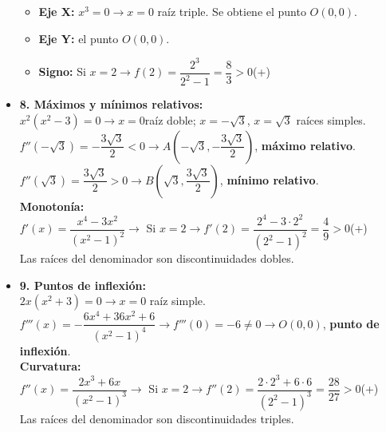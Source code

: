\begin{itemize}
	\begin{itemize}
		\item \textbf{Eje X: }$x^3=0 \rightarrow x=0$ raíz triple. Se obtiene el punto $O(0,0)$.
		\item \textbf{Eje Y: }el punto $O(0,0)$.
		\item \textbf{Signo: }Si $x=2 \rightarrow f(2)=\dfrac{2^3}{2^2-1}=\dfrac{8}{3}>0$(+)
	\end{itemize}
	\item \textbf{8. Máximos y mínimos relativos:}\\
	$x^2(x^2-3)=0 \rightarrow x=0 $raíz doble; $x=-\sqrt{3}$, $x=\sqrt{3}$ raíces simples.\\
	$f''(-\sqrt{3})=-\dfrac{3\sqrt{3}}{2}<0 \rightarrow A(-\sqrt{3}, -\dfrac{3\sqrt{3}}{2})$, \textbf{máximo relativo}.\\
	$f''(\sqrt{3})=\dfrac{3\sqrt{3}}{2}>0 \rightarrow B(\sqrt{3}, \dfrac{3\sqrt{3}}{2})$, \textbf{mínimo relativo}.\\
	\textbf{Monotonía: }\\
	$f'(x)=\dfrac{x^4-3x^2}{(x^2-1)^2} \rightarrow$ Si $x=2 \rightarrow f'(2)=\dfrac{2^4-3 \cdot 2^2}{(2^2-1)^2}=\dfrac{4}{9}>0$(+)\\
	Las raíces del denominador son discontinuidades dobles.
	\item \textbf{9. Puntos de inflexión:}\\
	$2x(x^2+3) = 0 \rightarrow x=0$ raíz simple.\\
	$f'''(x) = - \dfrac{6x^4+36x^2+6}{(x^2-1)^4} \rightarrow f'''(0)=-6 \neq 0 \rightarrow O(0,0)$, \textbf{punto de inflexión}.\\
	\textbf{Curvatura:}\\
	$f''(x)=\dfrac{2x^3+6x}{(x^2-1)^3} \rightarrow$ Si $x=2 \rightarrow f''(2)=\dfrac{2 \cdot 2^3+6 \cdot 6}{(2^2-1)^3}=\dfrac{28}{27}>0$(+)\\
	Las raíces del denominador son discontinuidades triples.
	
\end{itemize}
